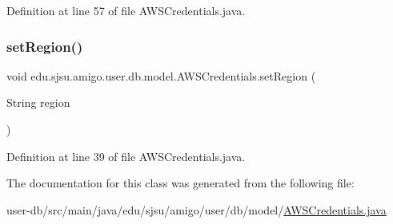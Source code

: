 Definition at line 57 of file A\+W\+S\+Credentials.\+java.

\mbox{\label{classedu_1_1sjsu_1_1amigo_1_1user_1_1db_1_1model_1_1_a_w_s_credentials_a206ac8db04865ca99863e949098e04e3}} 
\subsubsection{\texorpdfstring{set\+Region()}{setRegion()}}
{\footnotesize\ttfamily void edu.\+sjsu.\+amigo.\+user.\+db.\+model.\+A\+W\+S\+Credentials.\+set\+Region (\begin{DoxyParamCaption}\item[{String}]{region }\end{DoxyParamCaption})}



Definition at line 39 of file A\+W\+S\+Credentials.\+java.



The documentation for this class was generated from the following file\+:\begin{DoxyCompactItemize}
\item 
user-\/db/src/main/java/edu/sjsu/amigo/user/db/model/\hyperlink{_a_w_s_credentials_8java}{A\+W\+S\+Credentials.\+java}\end{DoxyCompactItemize}
